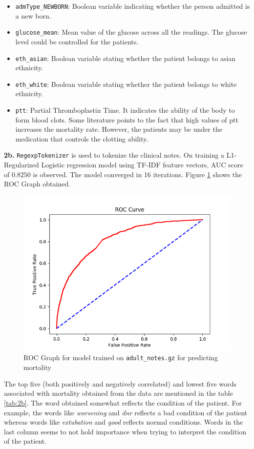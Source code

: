 \documentclass[]{article}
\begin{document}
\begin{itemize}
	\item \texttt{admType\_NEWBORN}: Boolean variable indicating whether the person admitted is a new born.
	\item \texttt{glucose\_mean}: Mean value of the glucose across all the readings. The glucose level could be controlled for the patients.
	\item \texttt{eth\_asian}: Boolean variable stating whether the patient belongs to asian ethnicity.
	\item \texttt{eth\_white}: Boolean variable stating whether the patient belongs to white ethnicity.
	\item \texttt{ptt}: Partial Thromboplastin Time. It indicates the ability of the body to form blood clots. Some literature points to the fact that high values of ptt increases the mortality rate. However, the patients may be under the medication that controls the clotting ability.
\end{itemize}


\textbf{2b.} \texttt{RegexpTokenizer} is used to tokenize the clinical notes. On training a L1-Regularized Logistic regression model using TF-IDF feature vectors, AUC score of $0.8250$ is observed. The model converged in 16 iterations. Figure \ref{fig:roc2b} shows the ROC Graph obtained. 

\begin{figure}
	\centering
	\includegraphics[width=0.8\linewidth]{ROC_part2b.png}
	\caption{ROC Graph for model trained on \texttt{adult\_notes.gz} for predicting mortality}
	\label{fig:roc2b}
\end{figure}

The top five (both positively and negatively correlated) and lowest five words associated with mortality obtained from the data are mentioned in the table \ref{tab:2b}. The word obtained somewhat reflects the condition of the patient. For example, the words like \textit{worsening} and \textit{dnr} reflects a bad condition of the patient whereas words like \textit{extubation} and \textit{good} reflects normal conditions. Words in the last column seems to not hold importance when trying to interpret the condition of the patient.
\end{document}
